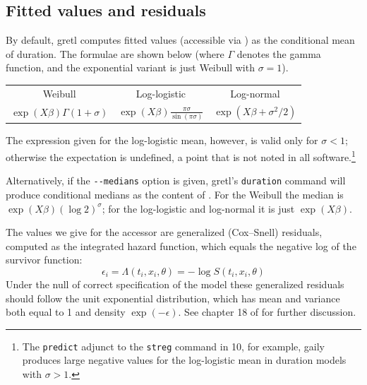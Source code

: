 \subsection{Fitted values and residuals}

By default, gretl computes fitted values (accessible via
) as the conditional mean of duration.  The formulae
are shown below (where $\Gamma$ denotes the gamma function, and the
exponential variant is just Weibull with $\sigma = 1$).

\begin{center}
\setlength\tabcolsep{1em}
\begin{tabular}{ccc}
Weibull & Log-logistic & Log-normal \\ [4pt]
$\exp(X\beta)\Gamma(1 + \sigma)$ &
$\displaystyle \exp(X\beta)\frac{\pi \sigma}{\sin(\pi \sigma)}$ &
$\exp(X\beta + \sigma^2/2)$
\end{tabular}
\end{center}

The expression given for the log-logistic mean, however, is valid only
for $\sigma < 1$; otherwise the expectation is undefined, a point that
is not noted in all software.\footnote{The \texttt{predict} adjunct to
  the \texttt{streg} command in  10, for example, gaily
  produces large negative values for the log-logistic mean in duration
  models with $\sigma > 1$.}

Alternatively, if the \verb|--medians| option is given, gretl's
\texttt{duration} command will produce conditional medians as the
content of .  For the Weibull the median is
$\exp(X\beta)(\log 2)^\sigma$; for the log-logistic and log-normal it
is just $\exp(X\beta)$.

The values we give for the accessor  are generalized
(Cox--Snell) residuals, computed as the integrated hazard function,
which equals the negative log of the survivor function:
\[
\epsilon_i = \Lambda(t_i, x_i, \theta) = -\log S(t_i, x_i, \theta)
\]
Under the null of correct specification of the model these generalized
residuals should follow the unit exponential distribution, which has
mean and variance both equal to 1 and density $\exp(-\epsilon)$. See
chapter 18 of \cite{cameron-trivedi05} for further discussion.

